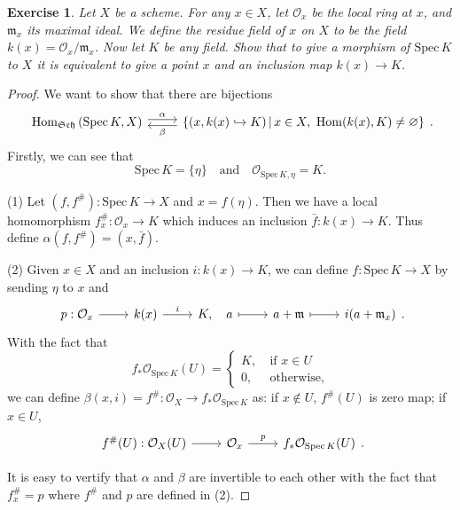 \documentclass{amsart}
\newtheorem{exe}{Exercise}[subsection]
\theoremstyle{remark}\newtheorem{rmk}[theorem]{Remark}
\begin{document}
\begin{exe}
	Let $X$ be a scheme. For any $x\in X$, let $\mathcal{O}_x$ be the local ring at $x$, and $\mathfrak{m}_x$ its maximal ideal. We define the \emph{residue field} of $x$ on $X$ to be the field $k(x)=\mathcal{O}_x/\mathfrak{m}_x$. Now let $K$ be any field. Show that to give a morphism of $\mathrm{Spec}\,K$ to $X$ it is equivalent to give a point $x$ and an inclusion map $k(x)\to K$.
\end{exe}
\begin{proof}
	We want to show that there are bijections
	\begin{equation*}
		\begin{tikzcd}
			{\mathrm{Hom}_{\mathfrak{Sch}}\left(\mathrm{Spec}\,K,X\right)} \arrow[r, "\alpha", shift left] & {\{(x,k(x)\hookrightarrow K)\,|\,x\in X,\ \mathrm{Hom}(k(x),K)\neq\varnothing\}} \arrow[l, "\beta", shift left]
		\end{tikzcd}.
	\end{equation*}
	Firstly, we can see that$$\mathrm{Spec}\,K=\{\eta\}\quad\text{and}\quad\mathcal{O}_{\mathrm{Spec}\,K,\eta}=K.$$
	
	(1) Let $(f,f^\#):\mathrm{Spec}\,K\to X$ and $x=f(\eta)$. Then we have a local homomorphism $f_x^\#:\mathcal{O}_x\to K$ which induces an inclusion $\bar{f}:k(x)\to K$. Thus define $\alpha(f,f^\#)=(x,\bar{f})$.
	
	(2) Given $x\in X$ and an inclusion $i:k(x)\to K$, we can define $f:\mathrm{Spec}\,K\to X$ by sending $\eta$ to $x$ and
	\begin{equation*}
		\begin{tikzcd}
			p:\mathcal{O}_x \arrow[r] & k(x) \arrow[r, "i"] & {K,\quad a} \arrow[r, maps to] & a+\mathfrak{m} \arrow[r, maps to] & i(a+\mathfrak{m}_x)
		\end{tikzcd}.
	\end{equation*}
	With the fact that
	\begin{equation*}
	f_*\mathcal{O}_{\mathrm{Spec}\,K}(U)=\left\{\begin{matrix}
	K,\ &\text{if }x\in U\\
	0,\ &\text{otherwise},
	\end{matrix}
	\right.
	\end{equation*}
	we can define $\beta(x,i)=f^\#:\mathcal{O}_X\to f_*\mathcal{O}_{\mathrm{Spec}\,K}$ as: if $x\notin U$, $f^\#(U)$ is zero map; if $x\in U$,
	\begin{equation*}
		\begin{tikzcd}
			f^\#(U):\mathcal{O}_X(U) \arrow[r] & \mathcal{O}_x \arrow[r, "p"] & {f_*\mathcal{O}_{\mathrm{Spec}\,K}(U)}
		\end{tikzcd}.
	\end{equation*}
	
	It is easy to vertify that $\alpha$ and $\beta$ are invertible to each other with the fact that $f^\#_x=p$ where $f^\#$ and $p$ are defined in (2).
\end{proof}
\end{document}
